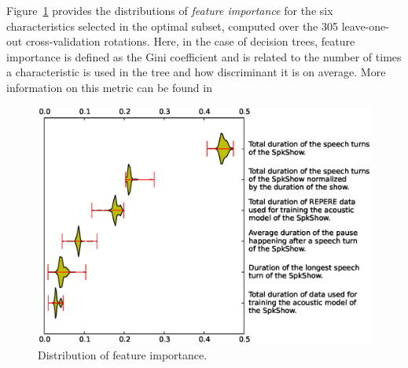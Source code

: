 Figure~\ref{fig:featureImportance} provides the distributions of \emph{feature importance} for the six characteristics selected in the optimal subset, computed over the 305 leave-one-out cross-validation rotations. 
Here, in the case of decision trees, feature importance is defined as the Gini coefficient and is related to the number of times a characteristic is used in the tree and how discriminant it is on average. More information on this metric can be found in~\cite{Breiman2001}
\begin{figure}[t]
\centering
\includegraphics[width=\linewidth]{figures/violin.eps}
\caption{Distribution of feature importance.}
\label{fig:featureImportance}
\end{figure}

